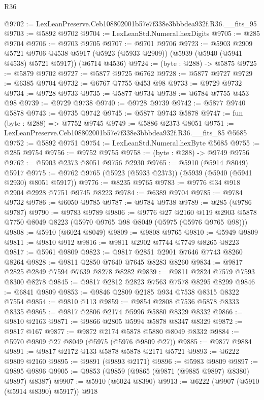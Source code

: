 \begin{lexlean}{R36}
\begin{coremodule}
@9702 := LexLeanPreserve.Ceb108802001b57e7f338e3bbbdea932f.R36.__fits_95
@9703 := @5892 @9702
@9704 := LexLeanStd.Numeral.hexDigits
@9705 := @285 @9704
@9706 := @9703 @9705
@9707 := @9701 @9706
@9723 := @5903
    @2909
    @5721
    @9706
    @4538
    @5917
    (@5923 (@5933 @2909))
    (@5939 (@5940 (@5941 @4538) @5721 @5917))
    (@6714 @4536)
@9724 := (byte : @288) -> @5875
@9725 := @5879 @9702
@9727 := @5877 @9725 @6762
@9728 := @5877 @9727
@9729 := @6385 @9704
@9732 := @6767 @7755 @453 @98
@9733 := @9729 @9732
@9734 := @9728 @9733
@9735 := @5877 @9734
@9738 := @6784 @7755 @453 @98
@9739 := @9729 @9738
@9740 := @9728 @9739
@9742 := @5877 @9740 @5878
@9743 := @9735 @9742
@9745 := @5877 @9743 @5878
@9747 := fun (byte : @288) => @7752 @9745
@9749 := @5886 @2373 @8051
@9751 := LexLeanPreserve.Ceb108802001b57e7f338e3bbbdea932f.R36.__fits_85 @5685
@9752 := @5892 @9751
@9754 := LexLeanStd.Numeral.hexByte @5685
@9755 := @285 @9754
@9756 := @9752 @9755
@9758 := (byte : @288) -> @9749 @9756
@9762 := @5903 @2373 @8051 @9756 @2930
@9765 := @5910 (@5914 @8049) @5917
@9775 := @9762 @9765 (@5923 (@5933 @2373)) (@5939 (@5940 (@5941 @2930) @8051 @5917))
@9776 := @8235 @9765
@9783 := @9776 @34 @918 @2904 @2928 @7751 @9745 @8223
@9784 := @6389 @9704
@9785 := @9784 @9732
@9786 := @6050 @9785
@9787 := @9784 @9738
@9789 := @285 (@9786 @9787)
@9790 := @9783 @9789
@9806 := @9776
    @27
    @2160
    @119
    @2903
    @5878
    @7750
    @8049
    @8223
    (@5970 @9765 @98 @8049 (@5975 (@5976 @9765 @98)))
@9808 := @5910 (@6024 @8049)
@9809 := @9808 @9765
@9810 := @5949 @9809
@9811 := @9810 @912
@9816 := @9811 @2902 @7744 @7749 @8265 @8223
@9817 := @5961 @9809
@9823 := @9817 @2851 @2901 @7646 @7743 @8260 @8264
@9828 := @9811 @2850 @7640 @7645 @8283 @8260
@9834 := @9817 @2825 @2849 @7594 @7639 @8278 @8282
@9839 := @9811 @2824 @7579 @7593 @8300 @8278
@9845 := @9817 @2812 @2823 @7563 @7578 @8295 @8299
@9846 := @6841 @9809
@9853 := @9846 @2809 @2185 @934 @7538 @8315 @8322 @7554
@9854 := @9810 @113
@9859 := @9854 @2808 @7536 @5878 @8333 @8335
@9865 := @9817 @2806 @2174 @5996 @5880 @8329 @8332
@9866 := @9810 @2163
@9871 := @9866 @2805 @5994 @5878 @8347 @8329
@9872 := @9817 @167
@9877 := @9872 @2174 @5878 @5880 @8049 @8332
@9884 := @5970 @9809 @27 @8049 (@5975 (@5976 @9809 @27))
@9885 := @9877 @9884
@9891 := @9817 @2172 @133 @5878 @5878 @2171 @5721
@9893 := @6222 @9809 @2160
@9895 := @9891 (@9893 @2171)
@9896 := @5983 @9809
@9897 := @9895 @9896
@9905 := @9853 (@9859 (@9865 (@9871 (@9885 @9897) @8380) @9897) @8387)
@9907 := @5910 (@6024 @8390)
@9913 := @6222 (@9907 (@5910 (@5914 @8390) @5917)) @918

\end{coremodule}
\end{lexlean}
